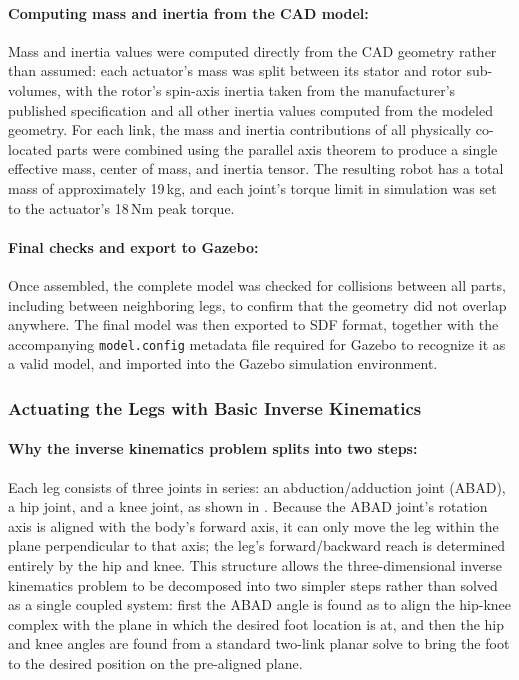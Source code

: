 \documentclass[12pt]{article}
\begin{document}
\paragraph{Computing mass and inertia from the CAD model:} Mass and inertia values were computed directly from the CAD geometry rather than assumed: each actuator's mass was split between its stator and rotor sub-volumes, with the rotor's spin-axis inertia taken from the manufacturer's published specification and all other inertia values computed from the modeled geometry. For each link, the mass and inertia contributions of all physically co-located parts were combined using the parallel axis theorem to produce a single effective mass, center of mass, and inertia tensor. The resulting robot has a total mass of approximately 19\,kg, and each joint's torque limit in simulation was set to the actuator's 18\,Nm peak torque.
\paragraph{Final checks and export to Gazebo:} Once assembled, the complete model was checked for collisions between all parts, including between neighboring legs, to confirm that the geometry did not overlap anywhere. The final model was then exported to SDF format, together with the accompanying \texttt{model.config} metadata file required for Gazebo to recognize it as a valid model, and imported into the Gazebo simulation environment.

\subsubsection{Actuating the Legs with Basic Inverse Kinematics}
\label{sec:actuating-legs}
\paragraph{Why the inverse kinematics problem splits into two steps:} Each leg consists of three joints in series: an abduction/adduction joint (ABAD), a hip joint, and a knee joint, as shown in . Because the ABAD joint's rotation axis is aligned with the body's forward axis, it can only move the leg within the plane perpendicular to that axis; the leg's forward/backward reach is determined entirely by the hip and knee. This structure allows the three-dimensional inverse kinematics problem to be decomposed into two simpler steps rather than solved as a single coupled system: first the ABAD angle is found as to align the hip-knee complex with the plane in which the desired foot location is at, and then the hip and knee angles are found from a standard two-link planar solve to bring the foot to the desired position on the pre-aligned plane.
\end{document}
